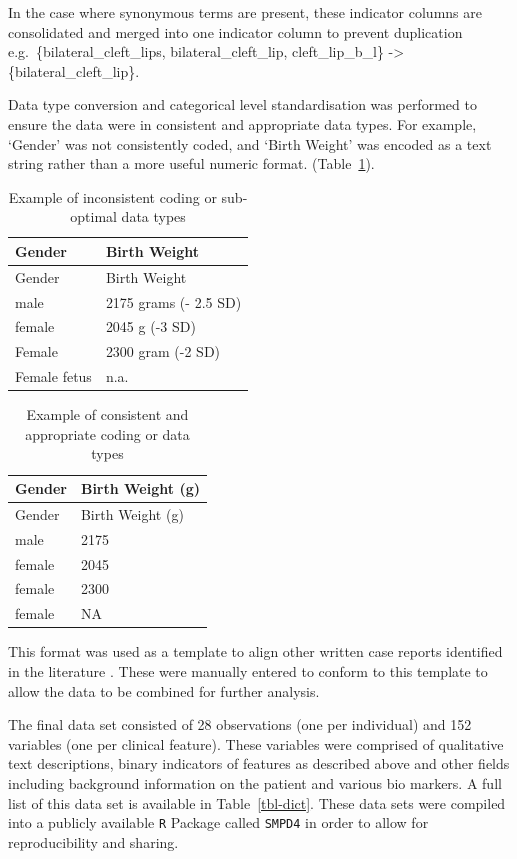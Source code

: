 \documentclass[
  authoryear,
  preprint,
  3p]{elsarticle}
\begin{document}
In the case where synonymous terms are present, these indicator columns
are consolidated and merged into one indicator column to prevent
duplication e.g.~\{bilateral\_cleft\_lips, bilateral\_cleft\_lip,
cleft\_lip\_b\_l\} -\textgreater{} \{bilateral\_cleft\_lip\}.

Data type conversion and categorical level standardisation was performed
to ensure the data were in consistent and appropriate data types. For
example, `Gender' was not consistently coded, and `Birth Weight' was
encoded as a text string rather than a more useful numeric format.
(Table~\ref{tbl-data-types}).

\hypertarget{tbl-data-types}{}
\begin{longtable}[]{@{}ll@{}}
\caption{\label{tbl-data-types}Example of inconsistent coding or
sub-optimal data types}\tabularnewline
\toprule()
Gender & Birth Weight \\
\midrule()
\endfirsthead
\toprule()
Gender & Birth Weight \\
\midrule()
\endhead
male & 2175 grams (- 2.5 SD) \\
female & 2045 g (-3 SD) \\
Female & 2300 gram (-2 SD) \\
Female fetus & n.a. \\
\bottomrule()
\end{longtable}

\hypertarget{tbl-data-types2}{}
\begin{longtable}[]{@{}ll@{}}
\caption{\label{tbl-data-types2}Example of consistent and appropriate
coding or data types}\tabularnewline
\toprule()
Gender & Birth Weight (g) \\
\midrule()
\endfirsthead
\toprule()
Gender & Birth Weight (g) \\
\midrule()
\endhead
male & 2175 \\
female & 2045 \\
female & 2300 \\
female & NA \\
\bottomrule()
\end{longtable}

This format was used as a template to align other written case reports
identified in the literature
\citep{ravenscroft2021neurogenetic, monies2019lessons, bijarnia2022growth, ji2022case}.
These were manually entered to conform to this template to allow the
data to be combined for further analysis.

The final data set consisted of 28 observations (one per individual) and
152 variables (one per clinical feature). These variables were comprised
of qualitative text descriptions, binary indicators of features as
described above and other fields including background information on the
patient and various bio markers. A full list of this data set is
available in Table~\ref{tbl-dict}. These data sets were compiled into a
publicly available \texttt{R} Package called \texttt{SMPD4}
\citep{smpd4-data} in order to allow for reproducibility and sharing.
\end{document}
